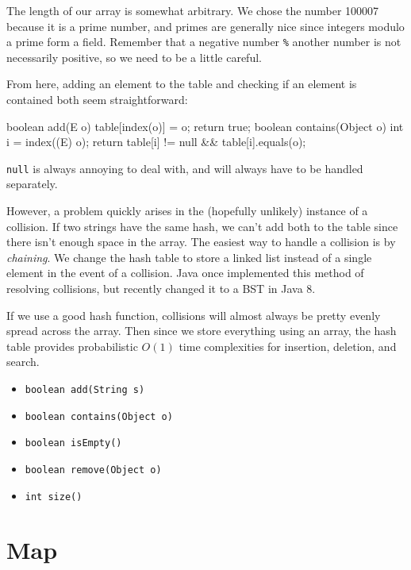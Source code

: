 The length of our array is somewhat arbitrary. We chose the number 100007 because it is a prime number, and primes are generally nice since integers modulo a prime form a field. Remember that a negative number \texttt{\%} another number is not necessarily positive, so we need to be a little careful.

From here, adding an element to the table and checking if an element is contained both seem straightforward:

\begin{mylstlisting}
boolean add(E o) {
	table[index(o)] = o;
    return true;
}
boolean contains(Object o) {
    int i = index((E) o);
	return table[i] != null && table[i].equals(o);
}
\end{mylstlisting}

\texttt{null} is always annoying to deal with, and will always have to be handled separately.

However, a problem quickly arises in the (hopefully unlikely) instance of a collision. If two strings have the same hash, we can't add both to the table since there isn't enough space in the array. The easiest way to handle a collision is by \textit{chaining}. We change the hash table to store a linked list instead of a single element in the event of a collision. Java once implemented this method of resolving collisions, but recently changed it to a BST in Java 8.

If we use a good hash function, collisions will almost always be pretty evenly spread across the array. Then since we store everything using an array, the hash table provides probabilistic $O(1)$ time complexities for insertion, deletion, and search.

\begin{itemize}

\item
\texttt{boolean add(String s)}

\item
\texttt{boolean contains(Object o)}

\item
\texttt{boolean isEmpty()}

\item
\texttt{boolean remove(Object o)}

\item
\texttt{int size()}

\end{itemize}

\section{Map}

